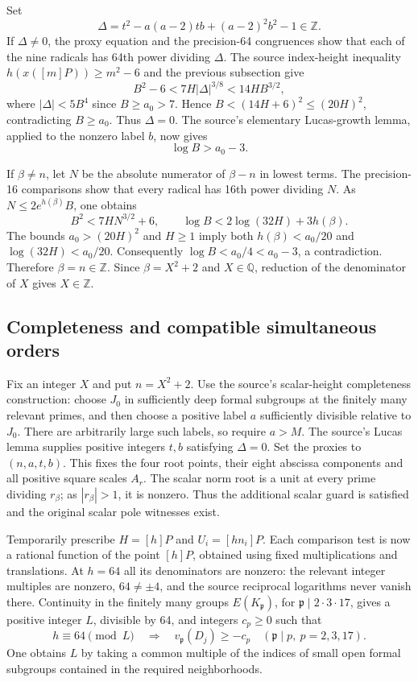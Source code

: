 \documentclass[11pt]{article}
\theoremstyle{definition}
\begin{document}
Set
\[
 \Delta=t^2-a(a-2)tb+(a-2)^2b^2-1\in\mathbb Z.
\]
If $\Delta\ne0$, the proxy equation and the precision-64 congruences
show that each of the nine radicals has 64th power dividing $\Delta$.
The source index-height inequality $h(x([m]P))\ge m^2-6$ and the
previous subsection give
\[
 B^2-6<7H|\Delta|^{3/8}<14HB^{3/2},
\]
where $|\Delta|<5B^4$ since $B\ge a_0>7$. Hence
$B<(14H+6)^2\le(20H)^2$, contradicting $B\ge a_0$.
Thus $\Delta=0$. The source's elementary Lucas-growth lemma, applied
to the nonzero label $b$, now gives
\[
 \log B>a_0-3.
\]

If $\beta\ne n$, let $N$ be the absolute numerator of $\beta-n$ in
lowest terms. The precision-16 comparisons show that every radical
has 16th power dividing $N$. As $N\le2e^{h(\beta)}B$, one obtains
\[
 B^2<7HN^{3/2}+6,
 \qquad \log B<2\log(32H)+3h(\beta).
\]
The bounds $a_0>(20H)^2$ and $H\ge1$ imply both
$h(\beta)<a_0/20$ and $\log(32H)<a_0/20$. Consequently
$\log B<a_0/4<a_0-3$, a contradiction. Therefore $\beta=n\in\mathbb Z$.
Since $\beta=X^2+2$ and $X\in\mathbb Q$, reduction of the denominator
of $X$ gives $X\in\mathbb Z$.

\subsection{Completeness and compatible simultaneous orders}

Fix an integer $X$ and put $n=X^2+2$. Use the source's scalar-height
completeness construction: choose $J_0$ in sufficiently deep formal
subgroups at the finitely many relevant primes, and then choose a
positive label $a$ sufficiently divisible relative to $J_0$. There
are arbitrarily large such labels, so require $a>M$. The source's
Lucas lemma supplies positive integers $t,b$ satisfying $\Delta=0$.
Set the proxies to $(n,a,t,b)$. This fixes the four root points, their
eight abscissa components and all positive square scales $A_r$.
The scalar norm root is a unit at every prime dividing $r_\beta$;
as $|r_\beta|>1$, it is nonzero. Thus the additional scalar guard
is satisfied and the original scalar pole witnesses exist.

Temporarily prescribe $H=[h]P$ and $U_i=[hn_i]P$. Each comparison
test is now a rational function of the point $[h]P$, obtained using
fixed multiplications and translations. At $h=64$ all its denominators
are nonzero: the relevant integer multiples are nonzero, $64\ne\pm4$,
and the source reciprocal logarithms never vanish there. Continuity
in the finitely many groups $E(K_{\mathfrak p})$, for
$\mathfrak p\mid2\cdot3\cdot17$, gives a positive integer $L$,
divisible by 64, and integers $c_p\ge0$ such that
\[
 h\equiv64\pmod L
 \quad\Longrightarrow\quad
 v_{\mathfrak p}(D_j)\ge-c_p
 \quad(\mathfrak p\mid p,\ p=2,3,17).
\]
One obtains $L$ by taking a common multiple of the indices of small
open formal subgroups contained in the required neighborhoods.
\end{document}
